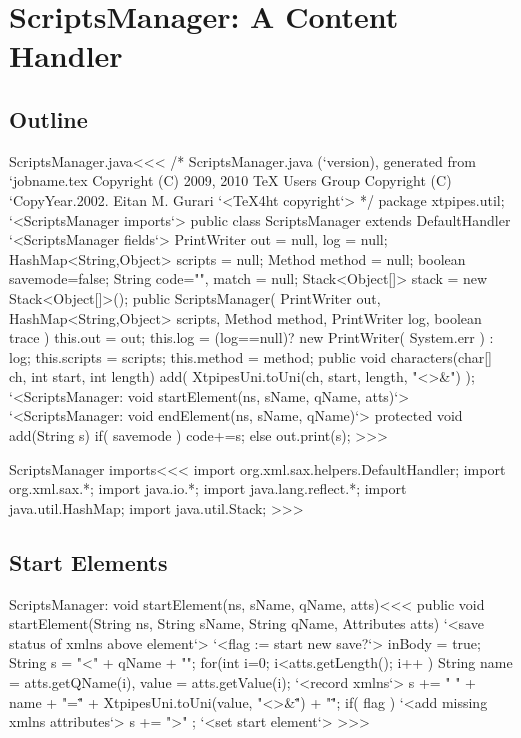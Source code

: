 \documentclass{article}
\begin{document}
\section{ScriptsManager: A Content Handler}

\label{ScriptsManager}


\subsection{Outline}


\<ScriptsManager.java\><<<
/* ScriptsManager.java (`version), generated from `jobname.tex
   Copyright (C) 2009, 2010 TeX Users Group
   Copyright (C) `CopyYear.2002. Eitan M. Gurari
`<TeX4ht copyright`> */
package xtpipes.util;
`<ScriptsManager imports`>
public class ScriptsManager extends DefaultHandler {
     `<ScriptsManager fields`>
     PrintWriter out = null, log = null;
     HashMap<String,Object> scripts = null;
     Method method = null;
     boolean savemode=false;
     String code="", match = null;
     Stack<Object[]> stack = new Stack<Object[]>();
   public ScriptsManager( PrintWriter out,
                          HashMap<String,Object> scripts,
                          Method method,
                          PrintWriter log, boolean trace ){
     this.out = out;
     this.log = (log==null)? new PrintWriter( System.err ) : log;
     this.scripts = scripts;
     this.method = method;
   }
   public void characters(char[] ch, int start, int length){
     add( XtpipesUni.toUni(ch, start, length, "<>&") );
   }
   `<ScriptsManager: void startElement(ns, sName, qName, atts)`>
   `<ScriptsManager: void endElement(ns, sName, qName)`>
   protected void add(String s){
      if( savemode ){ code+=s; }
      else { out.print(s); }
}  }
>>>


\<ScriptsManager imports\><<<
import org.xml.sax.helpers.DefaultHandler;
import org.xml.sax.*;
import java.io.*;
import java.lang.reflect.*;
import java.util.HashMap;
import java.util.Stack;
>>>

\subsection{Start Elements}




\<ScriptsManager: void startElement(ns, sName, qName, atts)\><<<
public void startElement(String ns, String sName,
                        String qName, Attributes atts) {
   `<save status of xmlns above element`>
   `<flag := start new save?`>
   inBody = true;
   String s =  "<" + qName + "\n";
   for(int i=0; i<atts.getLength(); i++ ){
      String name = atts.getQName(i),
             value = atts.getValue(i);
      `<record xmlns`>
      s += " " + name + "=\"" +
         XtpipesUni.toUni(value, "<>&\"") + "\"";
   }
   if( flag ){ `<add missing xmlns attributes`> }
   s += ">" ;
   `<set start element`>
}
>>>
\end{document}
